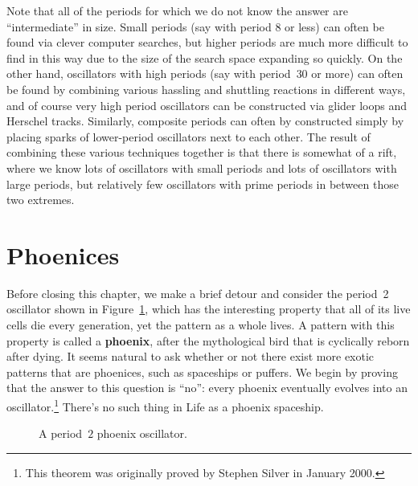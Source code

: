 Note that all of the periods for which we do not know the answer are ``intermediate'' in size. Small periods (say with period $8$ or less) can often be found via clever computer searches, but higher periods are much more difficult to find in this way due to the size of the search space expanding so quickly. On the other hand, oscillators with high periods (say with period~$30$ or more) can often be found by combining various hassling and shuttling reactions in different ways, and of course very high period oscillators can be constructed via glider loops and Herschel tracks. Similarly, composite periods can often by constructed simply by placing sparks of lower-period oscillators next to each other. The result of combining these various techniques together is that there is somewhat of a rift, where we know lots of oscillators with small periods and lots of oscillators with large periods, but relatively few oscillators with prime periods in between those two extremes.


\section{Phoenices}

Before closing this chapter, we make a brief detour and consider the period~2 oscillator shown in Figure~\ref{fig:phoenix}, which has the interesting property that all of its live cells die every generation, yet the pattern as a whole lives. A pattern with this property is called a \textbf{phoenix}, after the mythological bird that is cyclically reborn after dying. It seems natural to ask whether or not there exist more exotic patterns that are phoenices, such as spaceships or puffers. We begin by proving that the answer to this question is ``no'': every phoenix eventually evolves into an oscillator.\footnote{This theorem was originally proved by Stephen Silver in January 2000.} There's no such thing in Life as a phoenix spaceship.

\begin{figure}[!htb]
	\centering
	\caption{A period~$2$ phoenix oscillator.}\label{fig:phoenix}
\end{figure}

